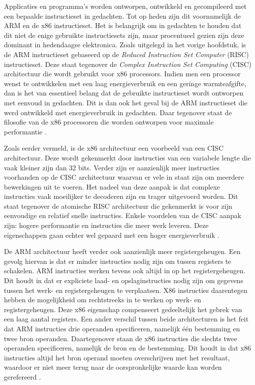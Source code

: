 Applicaties en programma’s worden ontworpen, ontwikkeld en gecompileerd met een bepaalde instructieset in gedachten. Tot op heden zijn dit voornamelijk de ARM en de x86 instructieset. Het is belangrijk om in gedachten te houden dat dit niet de enige gebruikte instructiesets zijn, maar procentueel gezien zijn deze dominant in hedendaagse elektronica. Zoals uitgelegd in het vorige hoofdstuk, is de ARM instructieset gebaseerd op de \textit{Reduced Instruction Set Computer} (RISC) instructieset. Deze staat tegenover de \textit{Complex Instruction Set Computing} (CISC) architectuur die wordt gebruikt voor x86 processors. Indien men een processor wenst te ontwikkelen met een laag energieverbruik en een geringe warmteafgifte, dan is het van essentieel belang dat de gebruikte instructieset wordt ontworpen met eenvoud in gedachten. Dit is dan ook het geval bij de ARM instructieset die werd ontwikkeld met energieverbruik in gedachten. Daar tegenover staat de filosofie van de x86 processoren die worden ontworpen voor maximale performantie \autocite{Triggs2022}.

Zoals eerder vermeld, is de x86 architectuur een voorbeeld van een CISC architectuur. Deze wordt gekenmerkt door instructies van een variabele lengte die vaak kleiner zijn dan 32 bits. Verder zijn er aanzienlijk meer instructies voorhanden op de CISC architectuur waarvan er vele in staat zijn om meerdere bewerkingen uit te voeren. Het nadeel van deze aanpak is dat complexe instructies vaak moeilijker te decoderen zijn en trager uitgevoerd worden. Dit staat tegenover de atomische RISC architectuur die gekenmerkt is voor zijn eenvoudige en relatief snelle instructies. Enkele voordelen van de CISC aanpak zijn: hogere performantie en instructies die meer werk leveren. Deze eigenschappen gaan echter wel gepaard met een hoger energieverbruik \autocite{SarahHarris2015}. 

De ARM architectuur heeft verder ook aanzienlijk meer registergeheugen. Een gevolg hiervan is dat er minder instructies nodig zijn om tussen registers te schakelen. ARM instructies werken tevens ook altijd in op het registergeheugen. Dit houdt in dat er expliciete laad- en opslaginstructies nodig zijn om gegevens tussen het werk- en registergeheugen te verplaatsen. X86 instructies daarentegen hebben de mogelijkheid om rechtstreeks in te werken op werk- en registergeheugen. Deze x86 eigenschap compenseert gedeeltelijk het gebrek van een laag aantal registers. Een ander verschil tussen beide architecturen is het feit dat ARM instructies drie operanden specificeren, namelijk één bestemming en twee bron operanden. Daartegenover staan de x86 instructies die slechts twee operanden specificeren, namelijk de bron en de bestemming. Dit houdt in dat x86 instructies altijd het bron operand moeten overschrijven met het resultaat, waardoor er niet meer terug naar de oorspronkelijke waarde kan worden gerefereerd \autocite{SarahHarris2015}. 

